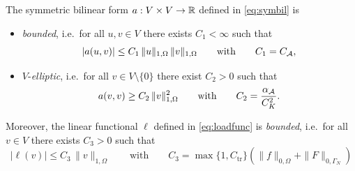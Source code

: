 \begin{proposition}\label{pr:aproperties}
	The symmetric bilinear form $a:V\times V\to {\mathbb R}$ defined in \eqref{eq:symbil} is
	\begin{itemize}
		\item[i)] {\em bounded}, i.e.\ for all $u,v\in V$ there exists $C_1<\infty$ such that
		      \begin{equation*}
			      |a(u,v)|\le C_1\,\|u\|_{1,\Omega}\,\|v\|_{1,\Omega}\qquad \text{with}\qquad C_1 = C_{\mathcal A},
		      \end{equation*}
		\item[ii)] $V$-{\em elliptic}, i.e.\ for all $v\in V\setminus\{0\}$ there exist $C_2>0$ such that
		      \begin{equation*}
			      a(v,v)\ge C_2\,\|v\|_{1,\Omega}^2\qquad\text{with}\qquad C_2 = \frac{\alpha_{\mathcal A}}{C_K^2}.
		      \end{equation*}
	\end{itemize}
	Moreover, the linear functional $\ell$ defined in \eqref{eq:loadfunc} is {\em bounded}, i.e.\ for all $v\in V$ there exists $C_3>0$ such that
	\begin{equation}\label{eq:ellbound}
		|\ell (v)|\le C_3\,\|v\|_{1,\Omega}\qquad\text{with}\qquad C_3 = \max\{1,C_\mathrm{tr}\}\left(\|f\|_{0,\Omega}+\|F\|_{0,\Gamma_N}\right)
	\end{equation}
\end{proposition}
